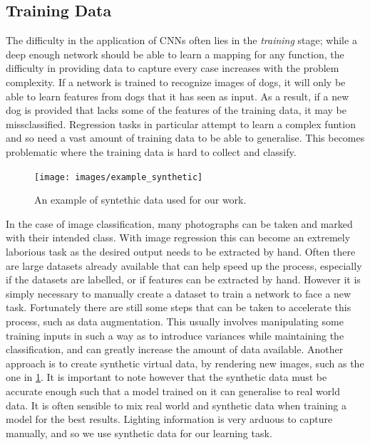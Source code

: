 \documentclass[ %
                    author={Gavin Parker},
                supervisor={Dr. Neill Campbell},
                    degree={MEng},
                     title={Deep Siamese Networks for Illumination Estimation from Stereo Images},
                  subtitle={},
                      type={research},
                      year={2018} ]{dissertation}
\begin{document}
\subsection{Training Data}
The difficulty in the application of CNNs often lies in the \textit{training} stage; while a deep enough network should be able to learn a mapping for any function, the difficulty in providing data to capture every case increases with the problem complexity. If a network is trained to recognize images of dogs, it will only be able to learn features from dogs that it has seen as input. As a result, if a new dog is provided that lacks some of the features of the training data, it may be missclassified. Regression tasks in particular attempt to learn a complex funtion and so need a vast amount of training data to be able to generalise. This becomes problematic where the training data is hard to collect and classify.
\begin{figure}
\texttt{[image: images/example\_synthetic]}
\centering
\caption{An example of syntethic data used for our work.}
\label{fig:synth}
\end{figure}
In the case of image classification, many photographs can be taken and marked with their intended class. With image regression this can become an extremely laborious task as the desired output needs to be extracted by hand. Often there are large datasets already available that can help speed up the process, especially if the datasets are labelled, or if features can be extracted by hand. However it is simply necessary to manually create a dataset to train a network to face a new task. Fortunately there are still some steps that can be taken to accelerate this process, such as data augmentation. This usually involves manipulating some training inputs in such a way as to introduce variances while maintaining the classification, and can greatly increase the amount of data available.
Another approach is to create synthetic virtual data, by rendering new images, such as the one in \ref{fig:synth}. It is important to note however that the synthetic data must be accurate enough such that a model trained on it can generalise to real world data. It is often sensible to mix real world and synthetic data when training a model for the best results. Lighting information is very arduous to capture manually, and so we use synthetic data for our learning task.

\end{document}
